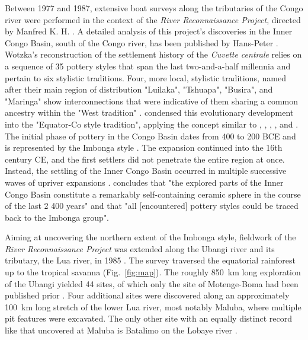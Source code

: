 \documentclass[smallextended,natbib]{svjour3}       %
\begin{document}
Between 1977 and 1987, extensive boat surveys along the tributaries of the Congo river were performed in the context of the \textit{River Reconnaissance Project}, directed by Manfred K. H. \citet{Eggert.1983,Eggert.1984,Eggert.1993,Eggert.1996}. A detailed analysis of this project’s discoveries in the Inner Congo Basin, south of the Congo river, has been published by Hans-Peter \citet{Wotzka.1995}. Wotzka’s reconstruction of the settlement history of the \textit{Cuvette centrale} relies on a sequence of 35 pottery styles that span the last two-and-a-half millennia and pertain to six stylistic traditions. Four, more local, stylistic traditions, named after their main region of distribution "Luilaka", "Tshuapa", "Busira", and "Maringa" show interconnections that were indicative of them sharing a common ancestry within the "West tradition" \citep[219--225 Fig.~4]{Wotzka.1995}. \citet{Wotzka.1995} condensed this evolutionary development into the "Equator-Co style tradition", applying the concept similar to \citet{Rouse.1957}, \citet{Huffman.1970}, \citet{Schmidt.1975}, \citet{Vogel.1978}, and \citet{Hall.1983}. The initial phase of pottery in the Congo Basin dates from 400 to 200 BCE and is represented by the Imbonga style \citep[59--68]{Wotzka.1995}. The expansion continued into the 16th century CE, and the first settlers did not penetrate the entire region at once. Instead, the settling of the Inner Congo Basin occurred in multiple successive waves of upriver expansions \citep[226--241]{Wotzka.1995}. \citet[290]{Wotzka.1995} concludes that "the explored parts of the Inner Congo Basin constitute a remarkably self-containing ceramic sphere in the course of the last 2 400 years" and that "all [encountered] pottery styles could be traced back to the Imbonga group".

Aiming at uncovering the northern extent of the Imbonga style, fieldwork of the \textit{River Reconnaissance Project} was extended along the Ubangi river and its tributary, the Lua river, in 1985 \citep{Eggert.1987a}. The survey traversed the equatorial rainforest up to the tropical savanna (Fig.~\ref{fig:map}). The roughly 850~km long exploration of the Ubangi yielded 44 sites, of which only the site of Motenge-Boma had been published prior \citep[75]{vanNoten.1978,vanNoten.1982a}. Four additional sites were discovered along an approximately 100~km long stretch of the lower Lua river, most notably Maluba, where multiple pit features were excavated. The only other site with an equally distinct record like that uncovered at Maluba is Batalimo on the Lobaye river \citep{DeBayleDesHermens.1969,DeBayleDesHermens.1971,deBayledesHermens.1975}.
\end{document}
